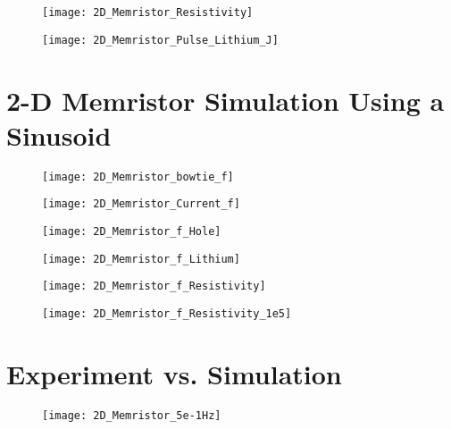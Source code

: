 \begin{figure}[!htp]
\centering
\texttt{[image: 2D\_Memristor\_Resistivity]}
\caption{} 
\label{}
\end{figure}



\begin{figure}[!htp]
\centering
\texttt{[image: 2D\_Memristor\_Pulse\_Lithium\_J]}
\caption{} 
\label{}
\end{figure}


\clearpage
\section{2-D Memristor Simulation Using a Sinusoid}

\begin{figure}[!htp]
\centering
\texttt{[image: 2D\_Memristor\_bowtie\_f]}
\caption{} 
\label{}
\end{figure}


\begin{figure}[!htp]
\centering
\texttt{[image: 2D\_Memristor\_Current\_f]}
\caption{} 
\label{}
\end{figure}

\begin{figure}[!htp]
\centering
\texttt{[image: 2D\_Memristor\_f\_Hole]}
\caption{} 
\label{}
\end{figure}

\begin{figure}[!htp]
\centering
\texttt{[image: 2D\_Memristor\_f\_Lithium]}
\caption{} 
\label{}
\end{figure}

\begin{figure}[!htp]
\centering
\texttt{[image: 2D\_Memristor\_f\_Resistivity]}
\caption{} 
\label{}
\end{figure}


\begin{figure}[!htp]
\centering
\texttt{[image: 2D\_Memristor\_f\_Resistivity\_1e5]}
\caption{} 
\label{}
\end{figure}

\clearpage
\section{Experiment vs. Simulation}



\begin{figure}[!htp]
\centering
\texttt{[image: 2D\_Memristor\_5e-1Hz]}
\caption{} 
\label{}
\end{figure}

